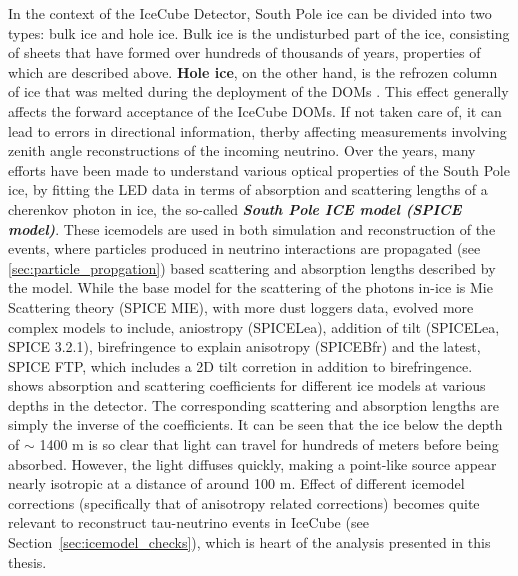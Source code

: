 In the context of the IceCube Detector, South Pole ice can be divided into two types: bulk ice and hole ice. Bulk ice is the undisturbed part of the ice, consisting of sheets that have formed over hundreds of thousands of years, properties of which are described above. \textbf{Hole ice}, on the other hand, is the refrozen column of ice that was melted during the deployment of the DOMs . This effect generally affects the forward acceptance of the IceCube DOMs. If not taken care of, it can lead to errors in directional information, therby affecting measurements involving zenith angle reconstructions of the incoming neutrino. Over the years, many efforts have been made to understand various optical properties of the South Pole ice, by fitting the LED data in terms of absorption and scattering lengths of a cherenkov photon in ice, the so-called \textbf{\emph{South Pole ICE model (SPICE model)}}. These icemodels are used in both simulation and reconstruction of the events, where particles produced in neutrino interactions are propagated (see \ref{sec:particle_propgation}) based scattering and absorption lengths described by the model. While the base model for the scattering of the photons in-ice is Mie Scattering theory \cite{miescattering} (SPICE MIE), with more dust loggers data, evolved more complex models to include, aniostropy (SPICELea), addition of tilt (SPICELea, SPICE 3.2.1), birefringence to explain anisotropy (SPICEBfr) and the latest, SPICE FTP, which includes a 2D tilt corretion in addition to birefringence.  shows absorption and scattering coefficients for different ice models at various depths in the detector. The corresponding scattering and absorption lengths are simply the inverse of the coefficients. It can be seen that the ice below the depth of $\sim$ 1400 m is so clear that light can travel for hundreds of meters before being absorbed. However, the light diffuses quickly, making a point-like source appear nearly isotropic at a distance of around 100 m. Effect of different icemodel corrections (specifically that of anisotropy related corrections) becomes quite relevant to reconstruct tau-neutrino events in IceCube (see Section~\ref{sec:icemodel_checks}), which is heart of the analysis presented in this thesis.


